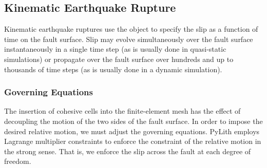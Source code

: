 \subsection{Kinematic Earthquake Rupture}

Kinematic earthquake ruptures use the  object
to specify the slip as a function of time on the fault surface. Slip
may evolve simultaneously over the fault surface instantaneously in a
single time step (as is usually done in quasi-static simulations) or
propagate over the fault surface over hundreds and up to thousands of
time steps (as is usually done in a dynamic simulation).


\subsubsection{Governing Equations}

The insertion of cohesive cells into the finite-element mesh has the
effect of decoupling the motion of the two sides of the fault surface.
In order to impose the desired relative motion, we must adjust the
governing equations. PyLith employs Lagrange multiplier constraints
to enforce the constraint of the relative motion in the strong sense.
That is, we enforce the slip across the fault at each degree of freedom.

